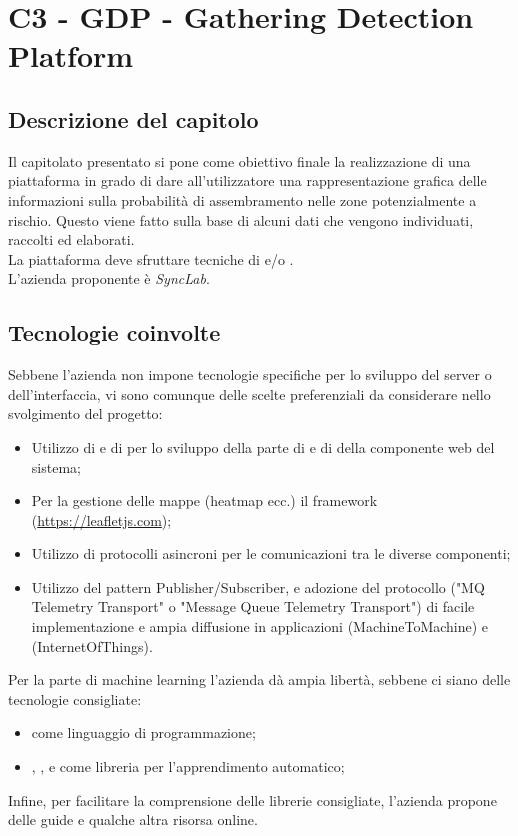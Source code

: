 \section{C3 - GDP - Gathering Detection Platform}

\subsection{Descrizione del capitolo}
Il capitolato presentato si pone come obiettivo finale la realizzazione di una piattaforma in grado di dare all'utilizzatore una rappresentazione grafica delle informazioni sulla probabilità di assembramento nelle zone potenzialmente a rischio. Questo viene fatto sulla base di alcuni dati che vengono individuati, raccolti ed elaborati. \\
La piattaforma deve sfruttare tecniche di  e/o .\\
L'azienda proponente è \textit{SyncLab}.

\subsection{Tecnologie coinvolte}
Sebbene l'azienda non impone tecnologie specifiche per lo sviluppo del server o dell'interfaccia, vi sono comunque delle scelte preferenziali da considerare nello svolgimento del progetto:
\begin{itemize}
\item Utilizzo di  e di  per lo sviluppo della parte di  e di  della componente web del sistema;
\item Per la gestione delle mappe (heatmap ecc.) il framework  (\url{https://leafletjs.com});
\item Utilizzo di protocolli asincroni per le comunicazioni tra le diverse componenti;
\item Utilizzo del pattern Publisher/Subscriber, e adozione del protocollo  ("MQ Telemetry Transport" o "Message Queue Telemetry Transport") di facile implementazione e ampia diffusione in applicazioni  (MachineToMachine) e  (InternetOfThings).
\end{itemize}
Per la parte di machine learning l'azienda dà ampia libertà, sebbene ci siano delle tecnologie consigliate:
\begin{itemize}
\item {} come linguaggio di programmazione;
\item {}, ,  e  come libreria per l'apprendimento automatico;
\end{itemize}
Infine, per facilitare la comprensione delle librerie consigliate, l'azienda propone delle guide e qualche altra risorsa online.


